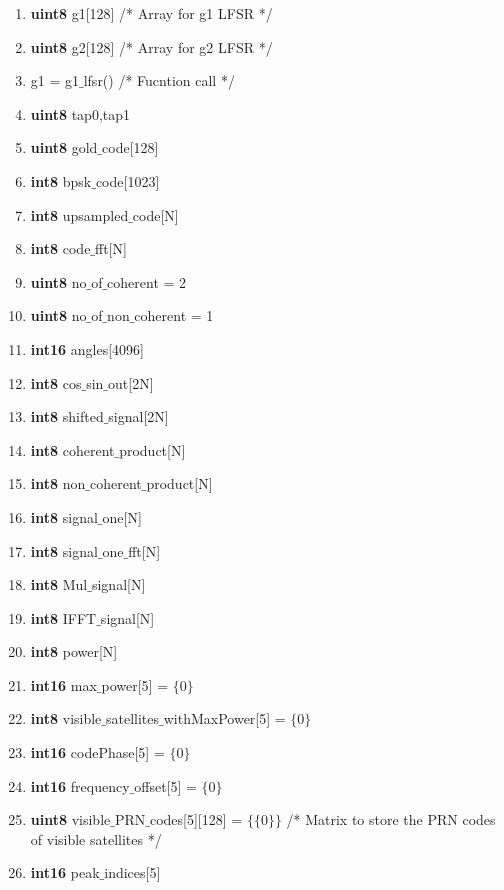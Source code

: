 \documentclass[journal,10pt,onecolumn]{article}
\begin{document}
\begin{itemize}
\begin{enumerate}
    \item[] \textbf{uint8} g1[128]   \hspace{5mm} /*  Array for g1 LFSR */
    \item[] \textbf{uint8} g2[128]   \hspace{5mm} /* Array for g2 LFSR */
    \item[] g1 =  g1$\_$lfsr()       \hspace{5mm} /* Fucntion call */
    \item[] \textbf{uint8} tap0,tap1
    \item[] \textbf{uint8} gold$\_$code[128] 
    \item[] \textbf{int8} bpsk$\_$code[1023]
    \item[] \textbf{int8} upsampled$\_$code[N]
    \item[] \textbf{int8} code$\_$fft[N]
    \item[] \textbf{uint8} no$\_$of$\_$coherent = 2
    \item[] \textbf{uint8} no$\_$of$\_$non$\_$coherent = 1
    \item[] \textbf{int16} angles[4096]
    \item[] \textbf{int8} cos$\_$sin$\_$out[2N]
    \item[] \textbf{int8} shifted$\_$signal[2N]
    \item[] \textbf{int8}  coherent$\_$product[N]
    \item[] \textbf{int8} non$\_$coherent$\_$product[N]
    \item[] \textbf{int8} signal$\_$one[N]
    \item[] \textbf{int8} signal$\_$one$\_$fft[N]
    \item[] \textbf{int8} Mul$\_$signal[N]
    \item[] \textbf{int8} IFFT$\_$signal[N]
    \item[] \textbf{int8} power[N]
    \item[] \textbf{int16} max$\_$power[5] = $\{0\}$ 
    \item[] \textbf{int8} visible$\_$satellites$\_$withMaxPower[5] = $\{0\}$
    \item[] \textbf{int16} codePhase[5] = $\{0\}$
    \item[] \textbf{int16} frequency$\_$offset[5] = $\{0\}$
    \item[] \textbf{uint8} visible$\_$PRN$\_$codes[5][128] = $\{\{0\}\}$  \hspace{5mm} /* Matrix to store the PRN codes of visible satellites */ 
    \item[] \textbf{int16} peak$\_$indices[5]

\end{enumerate}
\end{itemize}
\end{document}
